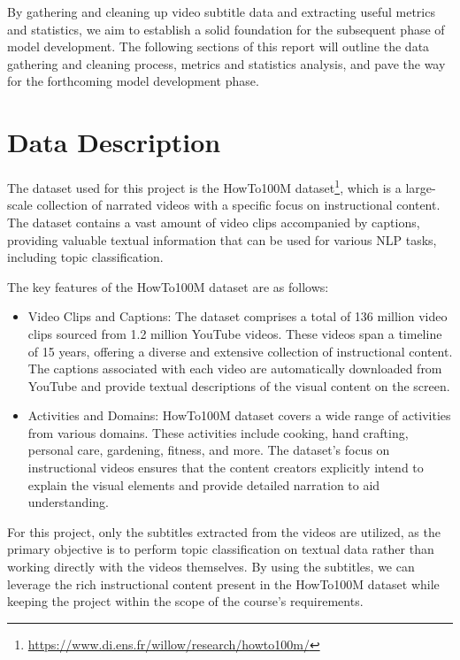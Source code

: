 \documentclass{article}
\begin{document}
By gathering and cleaning up video subtitle data and extracting useful metrics and statistics, we aim to establish a solid foundation for the subsequent phase of model development.
The following sections of this report will outline the data gathering and cleaning process, metrics and statistics analysis, and pave the way for the forthcoming model development phase.

\section{Data Description}
The dataset used for this project is the HowTo100M dataset\footnote{\url{https://www.di.ens.fr/willow/research/howto100m/}}, which is a large-scale collection of narrated videos with a specific focus on instructional content.
The dataset contains a vast amount of video clips accompanied by captions, providing valuable textual information that can be used for various NLP tasks, including topic classification.

The key features of the HowTo100M dataset are as follows:

\begin{itemize}
  \item Video Clips and Captions: The dataset comprises a total of 136 million video clips sourced from 1.2 million YouTube videos.
  These videos span a timeline of 15 years, offering a diverse and extensive collection of instructional content.
  The captions associated with each video are automatically downloaded from YouTube and provide textual descriptions of the visual content on the screen.
  \item Activities and Domains: HowTo100M dataset covers a wide range of activities from various domains.
  These activities include cooking, hand crafting, personal care, gardening, fitness, and more.
  The dataset's focus on instructional videos ensures that the content creators explicitly intend to explain the visual elements and provide detailed narration to aid understanding.
\end{itemize}

For this project, only the subtitles extracted from the videos are utilized, as the primary objective is to perform topic classification on textual data rather than working directly with the videos themselves.
By using the subtitles, we can leverage the rich instructional content present in the HowTo100M dataset while keeping the project within the scope of the course's requirements.
\end{document}
